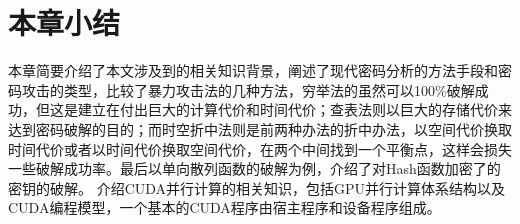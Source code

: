 \section{本章小结}
本章简要介绍了本文涉及到的相关知识背景，阐述了现代密码分析的方法手段和密码攻击的类型，比较了暴力攻击法的几种方法，穷举法的虽然可以100\%破解成功，但这是建立在付出巨大的计算代价和时间代价；查表法则以巨大的存储代价来达到密码破解的目的；而时空折中法则是前两种办法的折中办法，以空间代价换取时间代价或者以时间代价换取空间代价，在两个中间找到一个平衡点，这样会损失一些破解成功率。最后以单向散列函数的破解为例，介绍了对Hash函数加密了的密钥的破解。
介绍CUDA并行计算的相关知识，包括GPU并行计算体系结构以及CUDA编程模型，一个基本的CUDA程序由宿主程序和设备程序组成。

